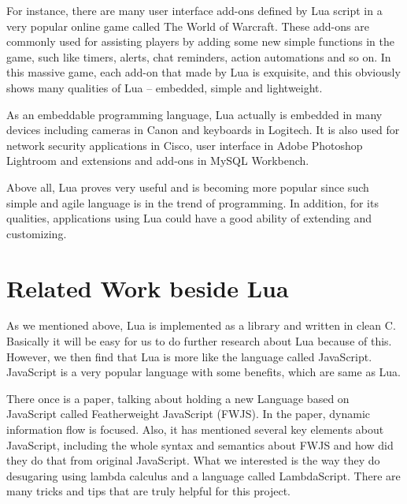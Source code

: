 For instance, there are many user interface add-ons defined by Lua script in a very popular online game called The World of Warcraft\cite{wowLua}. These add-ons are commonly used for assisting players by adding some new simple functions in the game, such like timers, alerts, chat reminders, action automations and so on. In this massive game, each add-on that made by Lua is exquisite, and this obviously shows many qualities of Lua -- embedded, simple and lightweight.

As an embeddable programming language, Lua actually is embedded in many devices including cameras in Canon and keyboards in Logitech. It is also used for network security applications in Cisco\cite{CISCO}, user interface in Adobe Photoshop Lightroom and extensions and add-ons in MySQL Workbench.

Above all, Lua proves very useful and is becoming more popular since such simple and agile language is in the trend of programming. In addition, for its qualities, applications using Lua could have a good ability of extending and customizing.

\section{Related Work beside Lua}
As we mentioned above, Lua is implemented as a library and written in clean C. Basically it will be easy for us to do further research about Lua because of this. However, we then find that Lua is more like the language called JavaScript. JavaScript is a very popular language with some benefits, which are same as Lua.

There once is a paper, talking about holding a new Language based on JavaScript called Featherweight JavaScript (FWJS)\cite{FWJS}. In the paper, dynamic information flow is focused. Also, it has mentioned several key elements about JavaScript, including the whole syntax and semantics about FWJS and how did they do that from original JavaScript. What we interested is the way they do desugaring using lambda calculus and a language called LambdaScript. There are many tricks and tips that are truly helpful for this project.
